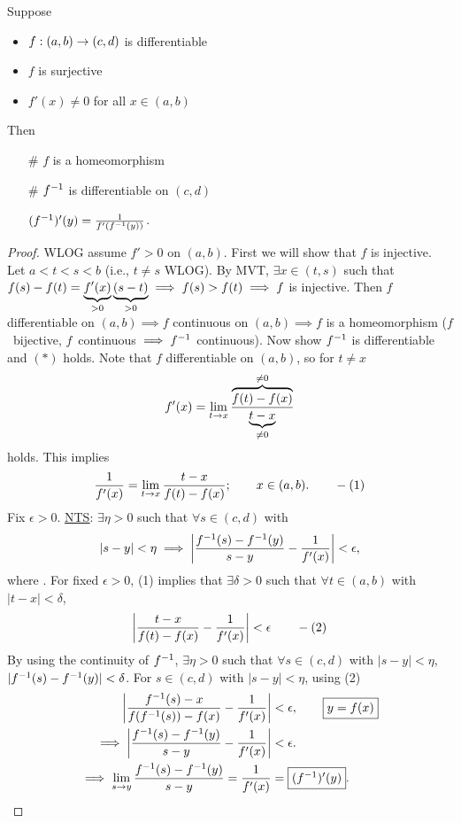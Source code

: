 \documentclass[]{article}
\begin{document}
\begin{recall}
Suppose
\begin{itemize}
	\item $f:(a,b)\ra(c,d)$ is differentiable
	\item $f$ is surjective
	\item $f'(x)\neq0$ for all $x\in(a,b)$
\end{itemize}
Then
\begin{enumerate}
	\item[\#] $f$ is a homeomorphism
	\item[\#] $f\inv$ is differentiable on $(c,d)$
		
		$(f\inv)'(y) = \frac1{f'(f\inv(y))}$.
\end{enumerate}
\end{recall}
\begin{proof}
	WLOG assume $f'>0$ on $(a,b)$.
	First we will show that $f$ is injective.
	Let $a<t<s<b$ (i.e., $t\neq s$ WLOG). By MVT, $\exists x\in(t,s)$ such that $f(s)-f(t) = \ub{>0}{f'(x)}\ub{>0}{(s-t)} \implies f(s)>f(t) \implies f$ is injective.
	Then $f$ differentiable on $(a,b) \implies f$ continuous on $(a,b) \implies f$ is a homeomorphism ($f$~bijective, $f$~continuous $\implies f\inv$ continuous).
	Now show $f\inv$ is differentiable and $(*)$ holds.
	Note that $f$ differentiable on $(a,b)$, so for $t\neq x$ $$f'(x)=\lim_{t\ra x} \frac{\ob{\neq0}{f(t)-f(x)}}{\ub{\neq0}{t-x}}$$ holds.
	This implies $$ \frac1{f'(x)} = \lim_{t\ra x} \frac{t-x}{f(t)-f(x)}; \qquad x\in(a,b). \qquad - (1) $$
	Fix $\epsilon>0$. \ul{\ul{NTS}}: $\exists\eta>0$ such that $\forall s\in(c,d)$ with $$|s-y|<\eta \implies \mlr{\frac{f\inv(s)-f\inv(y)}{s-y} - \frac1{f'(x)}} < \epsilon,$$ where .
	For fixed $\epsilon>0$, (1) implies that $\exists\delta>0$ such that $\forall t\in(a,b)$ with $|t-x|<\delta$,
	\begin{align*}
		\mlr{\frac{t-x}{f(t)-f(x)}-\frac1{f'(x)}} < \epsilon \qquad -(2)
	\end{align*}
	By using the continuity of $f\inv$, $\exists\eta>0$ such that $\forall s\in (c,d)$ with $|s-y|<\eta$, $|f\inv(s)-f\inv(y)|<\delta$.
	For $s\in(c,d)$ with $|s-y|<\eta$, using (2)
	\begin{align*}
		\mlr{\frac{f\inv(s)-x}{f(f\inv(s))-f(x)}-\frac1{f'(x)}} &< \epsilon, \qquad \fbox{$y=f(x)$} \\
		\implies \mlr{\frac{f\inv(s)-f\inv(y)}{s-y}-\frac1{f'(x)}} &<\epsilon. \\
		\implies \lim_{s\ra y} \frac{f\inv(s)-f\inv(y)}{s-y} = \frac1{f'(x)} &= \fbox{$(f\inv)'(y)$}.
	\end{align*}
\end{proof}
\end{document}

